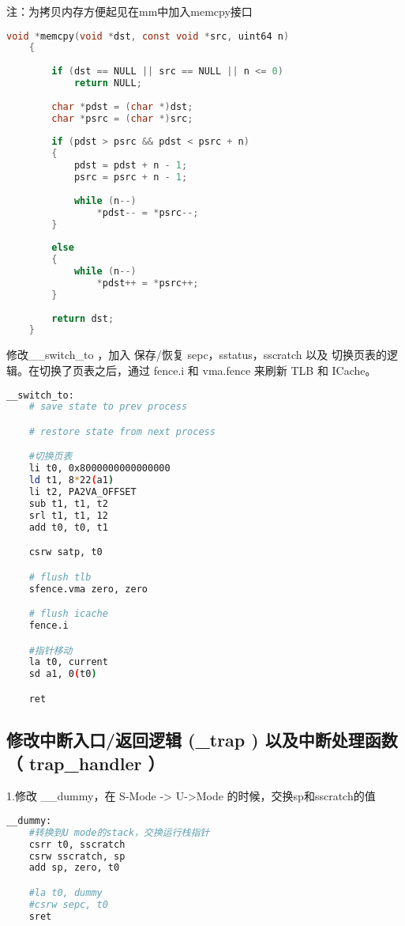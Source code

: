 \documentclass{source/Report}
\begin{document}
注：为拷贝内存方便起见在mm中加入memcpy接口

\begin{lstlisting}[language = c, title = {memcpy}]
    void *memcpy(void *dst, const void *src, uint64 n)
    {
    
        if (dst == NULL || src == NULL || n <= 0)
            return NULL;
    
        char *pdst = (char *)dst;
        char *psrc = (char *)src;
    
        if (pdst > psrc && pdst < psrc + n)
        {
            pdst = pdst + n - 1;
            psrc = psrc + n - 1;
    
            while (n--)
                *pdst-- = *psrc--;
        }
    
        else
        {
            while (n--)
                *pdst++ = *psrc++;
        }
    
        return dst;
    }
\end{lstlisting}

修改\_\_switch\_to ，加入 保存/恢复 sepc，sstatus，sscratch 以及 切换页表的逻辑。在切换了页表之后，通过 fence.i 和 vma.fence 来刷新 TLB 和 ICache。

\begin{lstlisting}[language = bash, title = {\_\_switch\_to}]
    __switch_to:
    # save state to prev process

    # restore state from next process

    #切换页表
    li t0, 0x8000000000000000
    ld t1, 8*22(a1)
    li t2, PA2VA_OFFSET
    sub t1, t1, t2
    srl t1, t1, 12
    add t0, t0, t1

    csrw satp, t0

    # flush tlb
    sfence.vma zero, zero

    # flush icache
    fence.i

    #指针移动
    la t0, current
    sd a1, 0(t0)

    ret
\end{lstlisting}

\subsection{修改中断入口/返回逻辑 (\_trap ) 以及中断处理函数 （ trap\_handler ）}

1.修改 \_\_dummy，在 S-Mode -> U->Mode 的时候，交换sp和sscratch的值

\begin{lstlisting}[language = bash, title = {\_\_dummy}]
__dummy:
    #转换到U mode的stack，交换运行栈指针
    csrr t0, sscratch
    csrw sscratch, sp
    add sp, zero, t0

    #la t0, dummy
    #csrw sepc, t0
    sret
\end{lstlisting}
\end{document}

